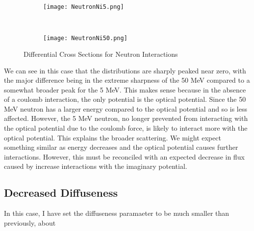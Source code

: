 \documentclass[paper=a4, fontsize=11pt]{scrartcl} %
\numberwithin{equation}{section} %
\numberwithin{figure}{section} %
\numberwithin{table}{section} %
\begin{document}
 \begin{figure}[hbt]
        \centering
        \begin{subfigure}[b!]{0.45\textwidth}
                \texttt{[image: NeutronNi5.png]}
        \end{subfigure}%
        ~ %
\quad
        \begin{subfigure}[b!]{0.45\textwidth}
                \texttt{[image: NeutronNi50.png]}
        \end{subfigure}

        \caption{Differential Cross Sections for Neutron Interactions}
\end{figure}

We can see in this case that the distributions are sharply peaked near zero, with the major difference being in the extreme sharpness of the 50 MeV compared to a somewhat  broader peak for the 5 MeV. This makes sense because in the absence of a coulomb interaction, the only potential is the optical potential. Since the 50 MeV neutron has a larger energy compared to the optical potential and so is less affected. However, the 5 MeV neutron, no longer prevented from interacting with the optical potential due to the coulomb force, is likely to interact more with the optical potential. This explains the broader scattering. We might expect something similar as energy decreases and the optical potential causes further interactions. However, this must be reconciled with an expected decrease in flux caused by increase interactions with the imaginary potential.\\

\subsection{Decreased Diffuseness}

In this case, I have set the diffuseness paramaeter to be much smaller than previously, about 
\end{document}
